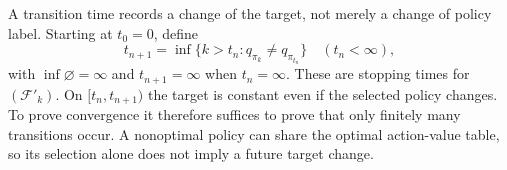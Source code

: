 A transition time records a change of the target, not merely a change of policy label. Starting at $t_0=0$, define
\begin{equation}\label{def: transition times}
t_{n+1}=\inf\{k>t_n:q_{\pi_k}\ne q_{\pi_{t_n}}\}\quad(t_n<\infty),
\end{equation}
with $\inf\varnothing=\infty$ and $t_{n+1}=\infty$ when $t_n=\infty$. These are stopping times for $(\mathcal F'_k)$. On $[t_n,t_{n+1})$ the target is constant even if the selected policy changes. To prove convergence it therefore suffices to prove that only finitely many transitions occur. A nonoptimal policy can share the optimal action-value table, so its selection alone does not imply a future target change.
